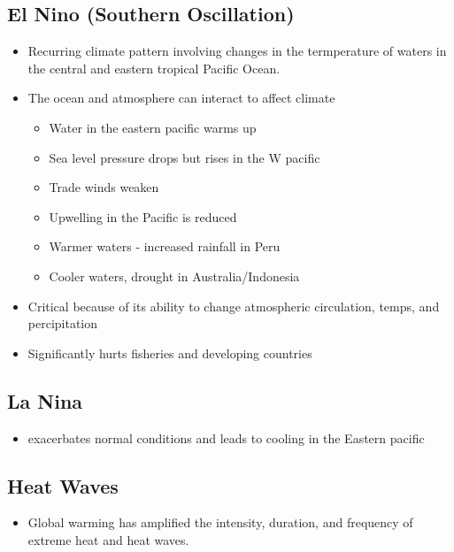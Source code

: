 \documentclass[11pt]{article}
\begin{document}
\subsection{El Nino (Southern Oscillation)}
\label{sec:orgf3496fc}
\begin{itemize}
\item Recurring climate pattern involving changes in the termperature of waters in the central
and eastern tropical Pacific Ocean.
\item The ocean and atmosphere can interact to affect climate
\begin{itemize}
\item Water in the eastern pacific warms up
\item Sea level pressure drops but rises in the W pacific
\item Trade winds weaken
\item Upwelling in the Pacific is reduced
\item Warmer waters - increased rainfall in Peru
\item Cooler waters, drought in Australia/Indonesia
\end{itemize}
\item Critical because of its ability to change atmospheric circulation, temps, and percipitation
\item Significantly hurts fisheries and developing countries
\end{itemize}
\subsection{La Nina}
\label{sec:orgfaad0e7}
\begin{itemize}
\item exacerbates normal conditions and leads to cooling in the Eastern pacific
\end{itemize}
\subsection{Heat Waves}
\label{sec:orgdb23379}
\begin{itemize}
\item Global warming has amplified the intensity, duration, and frequency of 
extreme heat and heat waves.
\end{itemize}
\end{document}
